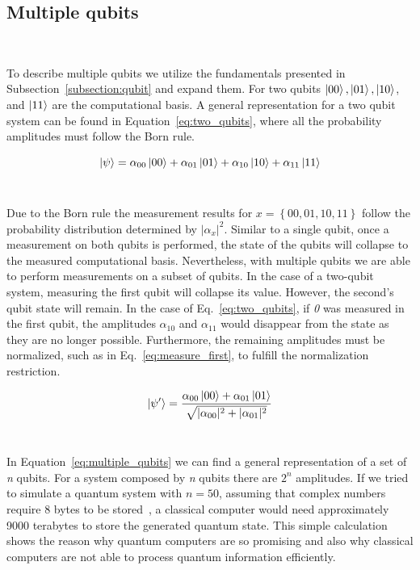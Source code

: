 \subsection{Multiple qubits} \

To describe multiple qubits we utilize the fundamentals presented in
Subsection~\ref{subsection:qubit} and expand them. For two qubits
\(\ket{00}, \ket{01}, \ket{10}\), and \(\ket{11}\) are the computational basis.
A general representation for a two qubit system can be found in 
Equation~\ref{eq:two_qubits}, where all the probability amplitudes must
follow the Born rule. \ 

\begin{equation}\label{eq:two_qubits}
  \ket{\psi} = \alpha_{00}\ket{00} + \alpha_{01}\ket{01} + \alpha_{10}\ket{10} + \alpha_{11}\ket{11}
\end{equation} \

Due to the Born rule the measurement results for
\(x = \left\{00, 01, 10, 11\right\}\) follow the probability
distribution determined by \(|\alpha_{x}|^2\). Similar to a
single qubit, once a measurement on both qubits is performed,
the state of the qubits will collapse to the measured computational
basis. Nevertheless, with multiple qubits we are able to perform
measurements on a subset of qubits. In the case of a two-qubit
system, measuring the first qubit will collapse its value. However,
the second's qubit state will remain. In the case of Eq.~\ref{eq:two_qubits},
if \textit{0} was measured in the first qubit, the amplitudes \(\alpha_{10}\)
and \(\alpha_{11}\) would disappear from the state as they are no longer
possible. Furthermore, the remaining amplitudes must be normalized,
such as in Eq.~\ref{eq:measure_first}, to fulfill the normalization
restriction.  \

\begin{equation}\label{eq:measure_first}
  \ket{\psi'} = \frac{\alpha_{00}\ket{00} + \alpha_{01}\ket{01}}
                    {\sqrt{|\alpha_{00}|^2 + |\alpha_{01}|^2}}
\end{equation} \

In Equation~\ref*{eq:multiple_qubits} we can find a general representation of
a set of \textit{n} qubits. For a system composed by \textit{n} qubits there are \(2^n\)
amplitudes. If we tried to simulate a quantum system with \(n = 50\), assuming
that complex numbers require 8 bytes to be stored~\cite{harris_array_2020}, a classical computer would need
approximately 9000 terabytes to store the generated quantum state. This simple calculation
shows the reason why quantum computers are so promising and also why classical computers
are not able to process quantum information efficiently. \

